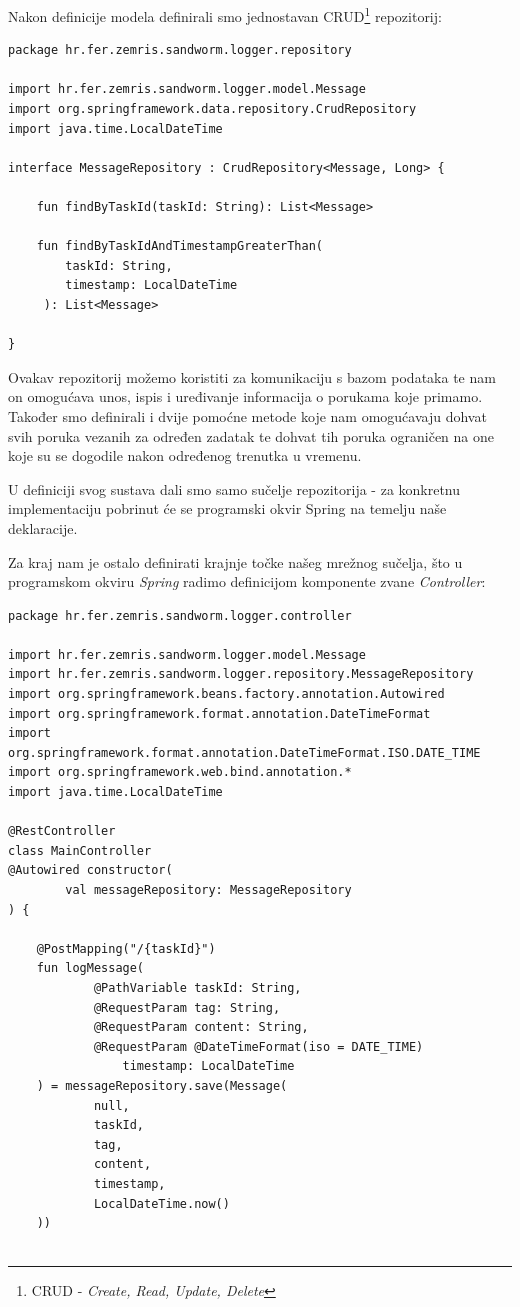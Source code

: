 \documentclass[times, utf8, zavrsni]{fer}
\begin{document}
{Nakon definicije modela definirali smo jednostavan CRUD{\footnote{CRUD - {\textit{Create, Read, Update, Delete}}}} repozitorij:

\begin{lstlisting}
package hr.fer.zemris.sandworm.logger.repository

import hr.fer.zemris.sandworm.logger.model.Message
import org.springframework.data.repository.CrudRepository
import java.time.LocalDateTime

interface MessageRepository : CrudRepository<Message, Long> {

    fun findByTaskId(taskId: String): List<Message>

    fun findByTaskIdAndTimestampGreaterThan(
	 	taskId: String,
		timestamp: LocalDateTime
	 ): List<Message>

}
\end{lstlisting}

Ovakav repozitorij možemo koristiti za komunikaciju s bazom podataka te nam on omogućava unos, ispis i uređivanje informacija o porukama koje primamo. Također smo definirali i dvije pomoćne metode koje nam omogućavaju dohvat svih poruka vezanih za određen zadatak te dohvat tih poruka ograničen na one koje su se dogodile nakon određenog trenutka u vremenu.

U definiciji svog sustava dali smo samo sučelje repozitorija - za konkretnu implementaciju pobrinut će se programski okvir Spring na temelju naše deklaracije.

Za kraj nam je ostalo definirati krajnje točke našeg mrežnog sučelja, što u programskom okviru {\textit{Spring}} radimo definicijom komponente zvane {\textit{Controller}}:

\begin{lstlisting}
package hr.fer.zemris.sandworm.logger.controller

import hr.fer.zemris.sandworm.logger.model.Message
import hr.fer.zemris.sandworm.logger.repository.MessageRepository
import org.springframework.beans.factory.annotation.Autowired
import org.springframework.format.annotation.DateTimeFormat
import org.springframework.format.annotation.DateTimeFormat.ISO.DATE_TIME
import org.springframework.web.bind.annotation.*
import java.time.LocalDateTime

@RestController
class MainController
@Autowired constructor(
        val messageRepository: MessageRepository
) {

    @PostMapping("/{taskId}")
    fun logMessage(
            @PathVariable taskId: String,
            @RequestParam tag: String,
            @RequestParam content: String,
            @RequestParam @DateTimeFormat(iso = DATE_TIME)
				timestamp: LocalDateTime
    ) = messageRepository.save(Message(
            null,
            taskId,
            tag,
            content,
            timestamp,
            LocalDateTime.now()
    ))


\end{lstlisting}}
\end{document}
